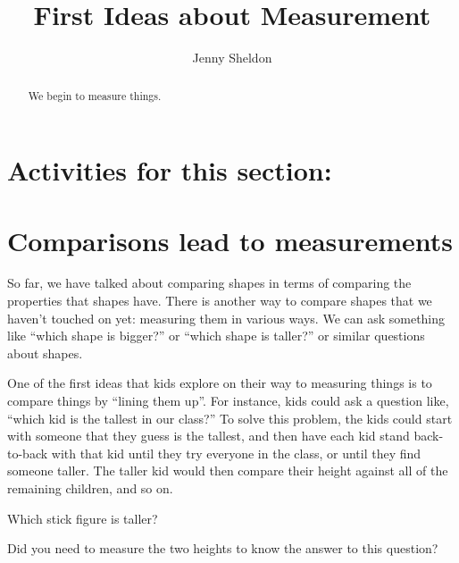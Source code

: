 \documentclass{ximera}
\title{First Ideas about Measurement}
\author{Jenny Sheldon}
\begin{document}
\begin{abstract}
We begin to measure things.
\end{abstract}
\maketitle

\section{Activities for this section:} 



\section{Comparisons lead to measurements}
So far, we have talked about comparing shapes in terms of comparing the properties that shapes have. There is another way to compare shapes that we haven't touched on yet: measuring them in various ways. We can ask something like ``which shape is bigger?'' or ``which shape is taller?'' or similar questions about shapes. 


One of the first ideas that kids explore on their way to measuring things is to compare things by ``lining them up''. For instance, kids could ask a question like, ``which kid is the tallest in our class?'' To solve this problem, the kids could start with someone that they guess is the tallest, and then have each kid stand back-to-back with that kid until they try everyone in the class, or until they find someone taller. The taller kid would then compare their height against all of the remaining children, and so on.
\begin{question}
Which stick figure is taller?
\begin{image}
\end{image}
\begin{multipleChoice}
\end{multipleChoice}

Did you need to measure the two heights to know the answer to this question?
\begin{multipleChoice}
\end{multipleChoice}
\end{question}
\end{document}
